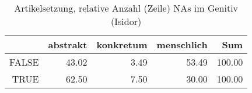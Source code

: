 \begin{table}[ht]
\centering
\begin{tabular}{rrrrr}
  \hline
 & abstrakt & konkretum & menschlich & Sum \\ 
  \hline
FALSE & 43.02 & 3.49 & 53.49 & 100.00 \\ 
  TRUE & 62.50 & 7.50 & 30.00 & 100.00 \\ 
   \hline
\end{tabular}
\caption{Artikelsetzung, relative Anzahl (Zeile) NAs im Genitiv (Isidor)} 
\end{table}
